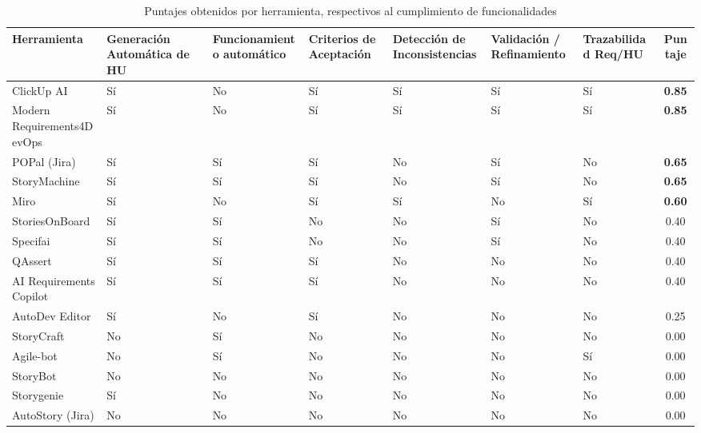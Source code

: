 \begin{table}
    \centering
    \caption{Puntajes obtenidos por herramienta, respectivos al cumplimiento de funcionalidades}
    \label{tab:herramientas_hu}
    \scriptsize
    \renewcommand{\arraystretch}{1.3}

    \begin{tabularx}{\textheight}{|
        X|
        >{\centering\arraybackslash}X|
        >{\centering\arraybackslash}X|
        >{\centering\arraybackslash}X|
        >{\centering\arraybackslash}X|
        >{\centering\arraybackslash}X|
        >{\centering\arraybackslash}X|
        c|}
        \hline
        \textbf{Herramienta} & 
        \textbf{Generación Automática de HU} & 
        \textbf{Funcionamiento automático} &
        \textbf{Criterios de Aceptación} & 
        \textbf{Detección de Inconsistencias} & 
        \textbf{Validación / Refinamiento} & 
        \textbf{Trazabilidad Req/HU} & 
        \textbf{Puntaje} \\ \hline
        ClickUp AI                 & Sí & No & Sí & Sí & Sí & Sí & \textbf{0.85} \\ \hline
        Modern Requirements4DevOps & Sí & No & Sí & Sí & Sí & Sí & \textbf{0.85} \\ \hline
        POPal (Jira)               & Sí & Sí & Sí & No & Sí & No & \textbf{0.65} \\ \hline
        StoryMachine               & Sí & Sí & Sí & No & Sí & No & \textbf{0.65} \\ \hline
        Miro                       & Sí & No & Sí & Sí & No & Sí & \textbf{0.60} \\ \hline
        StoriesOnBoard             & Sí & Sí & No & No & Sí & No & 0.40 \\ \hline
        Specifai                   & Sí & Sí & No & No & Sí & No & 0.40 \\ \hline
        QAssert                    & Sí & Sí & Sí & No & No & No & 0.40 \\ \hline
        AI Requirements Copilot    & Sí & Sí & Sí & No & No & No & 0.40 \\ \hline
        AutoDev Editor             & Sí & No & Sí & No & No & No & 0.25 \\ \hline
        StoryCraft                 & No & Sí & No & No & No & No & 0.00 \\ \hline
        Agile-bot                  & No & Sí & No & No & No & Sí & 0.00 \\ \hline
        StoryBot                   & No & No & No & No & No & No & 0.00 \\ \hline
        Storygenie                 & Sí & No & No & No & No & No & 0.00 \\ \hline
        AutoStory (Jira)           & No & No & No & No & No & No & 0.00 \\ \hline

    \end{tabularx}

\end{table}

